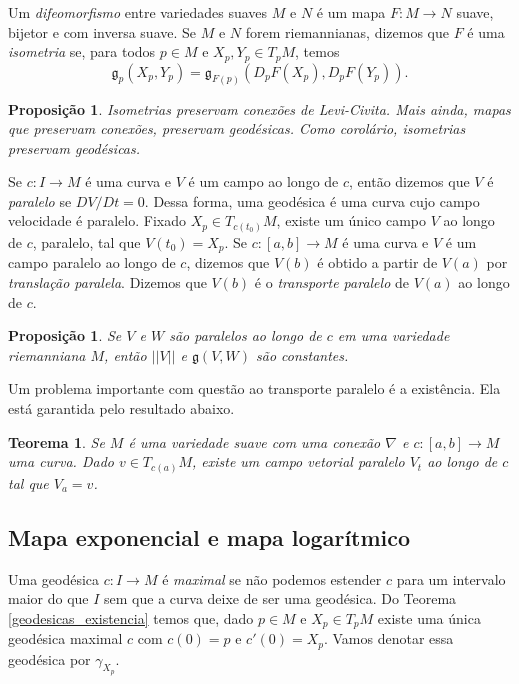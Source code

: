 \documentclass{article}
\newtheorem{proposition}[definition]{Proposição}
\newtheorem{theorem}[definition]{Teorema}
\begin{document}
Um \textit{difeomorfismo} entre variedades suaves $M$ e $N$ é um mapa $F \colon M \to N$ suave, bijetor e com inversa suave. Se $M$ e $N$ forem riemannianas, dizemos que $F$ é uma \textit{isometria} se, para todos $p \in M$ e $X_p, Y_p \in T_pM$, temos \begin{equation}
    \mathfrak{g}_p(X_p, Y_p) = \mathfrak{g}_{F(p)}(D_pF(X_p), D_pF(Y_p)).
\end{equation}

\begin{proposition}
    Isometrias preservam conexões de Levi-Civita. Mais ainda, mapas que preservam conexões, preservam geodésicas. Como corolário, isometrias preservam geodésicas.
\end{proposition}

Se $c \colon I \to M$ é uma curva e $V$ é um campo ao longo de $c$, então dizemos que $V$ é \textit{paralelo} se $DV/Dt = 0$. Dessa forma, uma geodésica é uma curva cujo campo velocidade é paralelo. Fixado $X_p \in T_{c(t_0)}M$, existe um único campo $V$ ao longo de $c$, paralelo, tal que $V(t_0) = X_p$. Se $c \colon [a,b] \to M$ é uma curva e $V$ é um campo paralelo ao longo de $c$, dizemos que $V(b)$ é obtido a partir de $V(a)$ por \textit{translação paralela}. Dizemos que $V(b)$ é o \textit{transporte paralelo} de $V(a)$ ao longo de $c$.

\begin{proposition}
    Se $V$ e $W$ são paralelos ao longo de $c$ em uma variedade riemanniana $M$, então $||V||$ e $\mathfrak{g}(V, W)$ são constantes.
\end{proposition}

Um problema importante com questão ao transporte paralelo é a existência. Ela está garantida pelo resultado abaixo.

\begin{theorem}
    Se $M$ é uma variedade suave com uma conexão $\nabla$ e $c \colon [a,b] \to M$ uma curva. Dado $v \in T_{c(a)}M$, existe um campo vetorial paralelo $V_t$ ao longo de $c$ tal que $V_a = v$.
\end{theorem}

\subsection{Mapa exponencial e mapa logarítmico}

Uma geodésica $c \colon I \to M$ é \textit{maximal} se não podemos estender $c$ para um intervalo maior do que $I$ sem que a curva deixe de ser uma geodésica. Do Teorema \ref{geodesicas_existencia} temos que, dado $p \in M$ e $X_p \in T_pM$ existe uma única geodésica maximal $c$ com $c(0) = p$ e $c'(0) = X_p$. Vamos denotar essa geodésica por $\gamma_{X_p}$.
\end{document}
